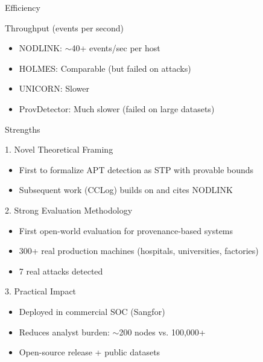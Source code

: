 \documentclass[11pt, aspectratio=169]{beamer}
\begin{document}
\begin{frame}{Efficiency}
    \begin{block}{Throughput (events per second)}
        \begin{itemize}
            \item NODLINK: $\sim$40+ events/sec per host
            \item HOLMES: Comparable (but failed on attacks)
            \item UNICORN: Slower
            \item ProvDetector: Much slower (failed on large datasets)
        \end{itemize}
    \end{block}
\end{frame}


\begin{frame}{Strengths}
    \begin{exampleblock}{1. Novel Theoretical Framing}
        \begin{itemize}
            \item First to formalize APT detection as STP with provable bounds
            \item Subsequent work (CCLog) builds on and cites NODLINK
        \end{itemize}
    \end{exampleblock}
    \begin{exampleblock}{2. Strong Evaluation Methodology}
        \begin{itemize}
            \item First open-world evaluation for provenance-based systems
            \item 300+ real production machines (hospitals, universities, factories)
            \item 7 real attacks detected
        \end{itemize}
    \end{exampleblock}
    \begin{exampleblock}{3. Practical Impact}
        \begin{itemize}
            \item Deployed in commercial SOC (Sangfor)
            \item Reduces analyst burden: $\sim$200 nodes vs. 100,000+
            \item Open-source release + public datasets
        \end{itemize}
    \end{exampleblock}
\end{frame}
\end{document}
